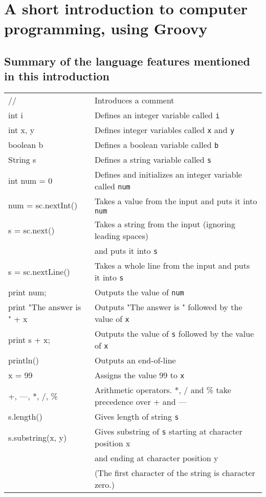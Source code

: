 \section{A short introduction to computer programming, using Groovy}
 
\subsection{Summary of the language features mentioned in this introduction}

\begin{tabular}{@{\ttfamily}l l}
// & Introduces a comment\\
int i & Defines an integer variable called \texttt{i}\\
int x, y & Defines integer variables called \texttt{x} and \texttt{y}\\
boolean b & Defines a boolean variable called \texttt{b}\\
String s & Defines a string variable called \texttt{s}\\
int num = 0 & Defines and initializes an integer variable called \texttt{num}\\
num = sc.nextInt() & Takes a value from the input and puts it into \texttt{num}\\
s = sc.next() & Takes a string from the input (ignoring leading spaces) \\
& and puts it into \texttt{s}\\
s = sc.nextLine() & Takes a whole line from the input and puts it into \texttt{s}\\
print num; & Outputs the value of \texttt{num}\\
print "The answer is " + x & Outputs "The answer is " followed by the value of \texttt{x}\\
print  s + x; & Outputs the value of \texttt{s} followed by the value of \texttt{x}\\
println() & Outputs an end-of-line\\
x = 99 & Assigns the value 99 to \texttt{x}\\
+, ---, *, /, \% & Arithmetic operators.  *, / and \% take precedence over + and ---\\
s.length() & Gives length of string \texttt{s}\\
s.substring(x, y) & Gives substring of \texttt{s} starting at character position x \\
& and ending at character position y\\
 & (The first character of the string is character zero.)\\

\end{tabular}
